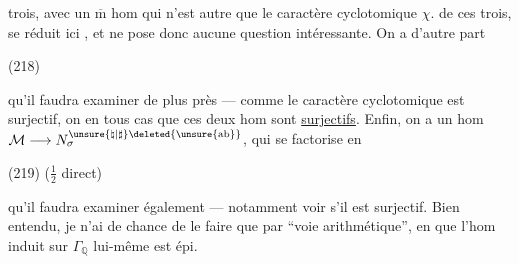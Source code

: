 
trois,  avec un $\overline{\mathrm m}$ hom
qui n'est autre que le caractère cyclotomique $\chi$.
 de ces trois,
se réduit ici  , et ne pose donc aucune question intéressante. On a d'autre part

\noindent (218)\quad
{}

qu'il faudra examiner de plus près --- comme le caractère cyclotomique est  surjectif, on  en tous cas que ces deux hom sont \uline{surjectifs}. Enfin, on a un hom
$\mathcal M\longrightarrow N_{\sigma}^{\unsure{\natural|\sharp}\deleted{\unsure{\mathrm{ab}}}}$, qui se factorise en

\noindent (219)\quad
{}
\hfill ($\frac12$ direct)

qu'il faudra examiner également --- notamment voir s'il est surjectif.
Bien entendu, je n'ai de chance de le faire que par ``voie arithmétique'', en  que l'hom induit sur $\Gamma_{\mathbb Q}$ lui-même est épi.


